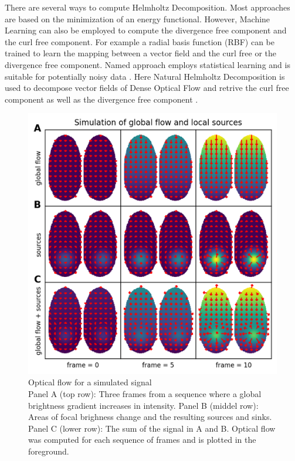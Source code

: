  There are several ways to compute Helmholtz Decomposition. Most approaches are based on the minimization of an energy functional. However, Machine Learning can also be employed to compute the divergence free component and the curl free component. For example a radial basis function (RBF) can be trained to learn the mapping between a vector field and the curl free or the divergence free component. Named approach employs statistical learning and is suitable for potentially noisy data \parencite{bhatia2012helmholtz}. Here Natural Helmholtz Decomposition is used to decompose vector fields of Dense Optical Flow and retrive the curl free component as well as the divergence free component \parencite{bhatia2014natural}. \\
\begin{figure}[!htb]
\centering
\includegraphics[width=\textwidth,height=\textheight,keepaspectratio]{Figures/optical_flow_for_a_simulated_signal}
\decoRule
\caption[Optical flow for a simulated signal]{Optical flow for a simulated signal\\ Panel A (top row): Three frames from a sequence where a global brightness gradient increases in intensity. Panel B (middel row): Areas of focal brighness change and the resulting sources and sinks. Panel C (lower row): The sum of the signal in A and B. Optical flow was computed for each sequence of frames and is plotted in the foreground.}
\label{fig:optical_flow_for_a_simulated_signal}
\end{figure}
